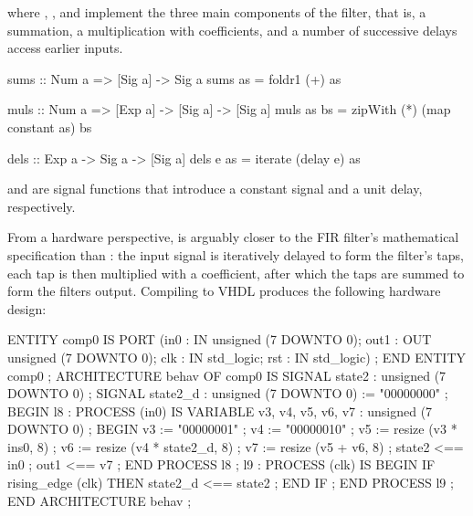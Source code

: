 \documentclass[../paper.tex]{subfiles}
\begin{document}
\noindent where , , and  implement the three main components of the filter, that is, a summation, a multiplication with coefficients, and a number of successive delays access earlier inputs.

\begin{code}
sums :: Num a => [Sig a] -> Sig a
sums as = foldr1 (+) as

muls :: Num a => [Exp a] -> [Sig a] -> [Sig a]
muls as bs = zipWith (*) (map constant as) bs

dels :: Exp a -> Sig a -> [Sig a]
dels e as = iterate (delay e) as
\end{code}

\noindent {} and  are signal functions that introduce a constant signal and a unit delay, respectively.


From a hardware perspective,  is arguably closer to the FIR filter's mathematical specification than : the input signal is iteratively delayed to form the filter's taps, each tap is then multiplied with a coefficient, after which the taps are summed to form the filters output. Compiling  to VHDL produces the following hardware design:

\begin{code}
ENTITY comp0 IS
  PORT (in0 : IN unsigned (7 DOWNTO 0);
        out1 : OUT unsigned (7 DOWNTO 0);
        clk : IN std_logic;
        rst : IN std_logic) ;
END ENTITY comp0 ;
ARCHITECTURE behav OF comp0 IS
  SIGNAL state2 : unsigned (7 DOWNTO 0) ;
  SIGNAL state2_d : unsigned (7 DOWNTO 0) := "00000000" ;
BEGIN
  l8 :
    PROCESS (in0) IS
      VARIABLE v3, v4, v5, v6, v7 : unsigned (7 DOWNTO 0) ; 
    BEGIN
      v3 := "00000001" ;
      v4 := "00000010" ;
      v5 := resize (v3 * ins0, 8) ;
      v6 := resize (v4 * state2_d, 8) ;
      v7 := resize (v5 + v6, 8) ;
      state2 <== in0 ;
      out1 <== v7 ;
    END PROCESS l8 ;
  l9 :
    PROCESS (clk) IS
    BEGIN
      IF rising_edge (clk) THEN
        state2_d <== state2 ;
      END IF ;
    END PROCESS l9 ;
END ARCHITECTURE behav ;
\end{code}
\end{document}
